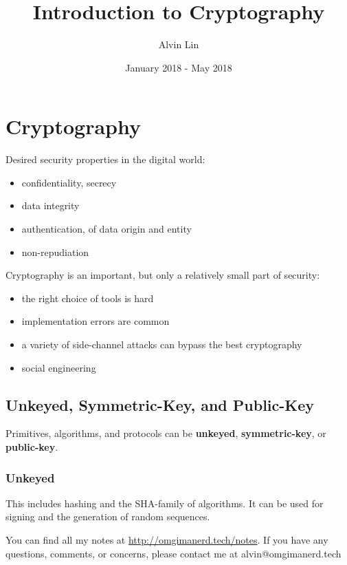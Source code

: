 \documentclass{math}
\title{Introduction to Cryptography}
\author{Alvin Lin}
\date{January 2018 - May 2018}
\begin{document}
\maketitle

\section*{Cryptography}
Desired security properties in the digital world:
\begin{itemize}
  \item confidentiality, secrecy
  \item data integrity
  \item authentication, of data origin and entity
  \item non-repudiation
\end{itemize}
Cryptography is an important, but only a relatively small part of security:
\begin{itemize}
  \item the right choice of tools is hard
  \item implementation errors are common
  \item a variety of side-channel attacks can bypass the best cryptography
  \item social engineering
\end{itemize}

\subsection*{Unkeyed, Symmetric-Key, and Public-Key}
Primitives, algorithms, and protocols can be \textbf{unkeyed},
\textbf{symmetric-key}, or \textbf{public-key}.

\subsubsection*{Unkeyed}
This includes hashing and the SHA-family of algorithms. It can be used for
signing and the generation of random sequences.

\begin{center}
  You can find all my notes at \url{http://omgimanerd.tech/notes}. If you have
  any questions, comments, or concerns, please contact me at
  alvin@omgimanerd.tech
\end{center}
\end{document}
